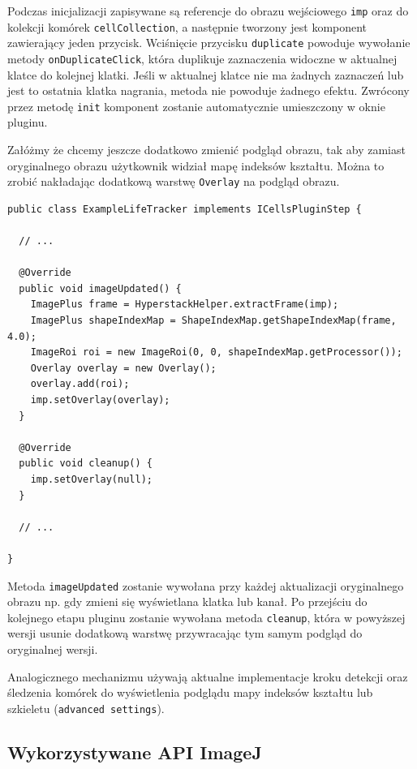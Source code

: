 \documentclass[declaration,shortabstract,mgr]{iithesis}
\begin{document}
Podczas inicjalizacji zapisywane są referencje do obrazu wejściowego \texttt{imp} oraz do kolekcji komórek \texttt{cellCollection}, a następnie tworzony jest komponent zawierający jeden przycisk.
Wciśnięcie przycisku \texttt{duplicate} powoduje wywołanie metody \texttt{onDuplicateClick}, która duplikuje zaznaczenia widoczne w aktualnej klatce do kolejnej klatki.
Jeśli w aktualnej klatce nie ma żadnych zaznaczeń lub jest to ostatnia klatka nagrania, metoda nie powoduje żadnego efektu.
Zwrócony przez metodę \texttt{init} komponent zostanie automatycznie umieszczony w oknie pluginu.

Załóżmy że chcemy jeszcze dodatkowo zmienić podgląd obrazu, tak aby zamiast oryginalnego obrazu użytkownik widział mapę indeksów kształtu.
Można to zrobić nakładając dodatkową warstwę \texttt{Overlay} na podgląd obrazu.

\par\bigskip

\begin{lstlisting}
public class ExampleLifeTracker implements ICellsPluginStep {

  // ...
  
  @Override
  public void imageUpdated() {
    ImagePlus frame = HyperstackHelper.extractFrame(imp);
    ImagePlus shapeIndexMap = ShapeIndexMap.getShapeIndexMap(frame, 4.0);
    ImageRoi roi = new ImageRoi(0, 0, shapeIndexMap.getProcessor());
    Overlay overlay = new Overlay();
    overlay.add(roi);
    imp.setOverlay(overlay);
  }

  @Override
  public void cleanup() {
    imp.setOverlay(null);
  }
  
  // ...

}  
\end{lstlisting}

Metoda \texttt{imageUpdated} zostanie wywołana przy każdej aktualizacji oryginalnego obrazu np. gdy zmieni się wyświetlana klatka lub kanał.
Po przejściu do kolejnego etapu pluginu zostanie wywołana metoda \texttt{cleanup}, która w powyższej wersji usunie dodatkową warstwę przywracając tym samym podgląd do oryginalnej wersji.

Analogicznego mechanizmu używają aktualne implementacje kroku detekcji oraz śledzenia komórek do wyświetlenia podglądu mapy indeksów kształtu lub szkieletu (\texttt{advanced settings}).

\subsection{Wykorzystywane API ImageJ}
\end{document}
